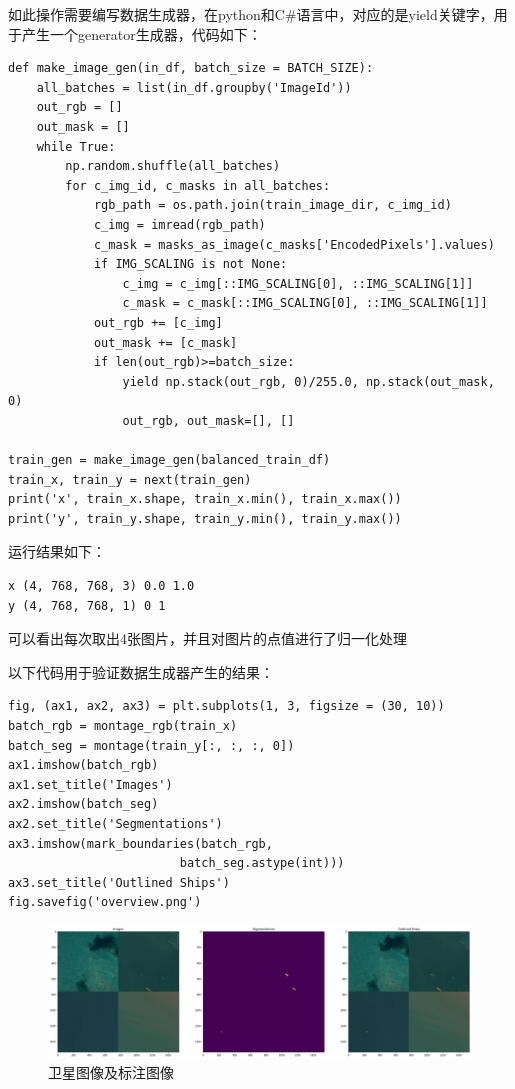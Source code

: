 如此操作需要编写数据生成器，在python和C\#语言中，对应的是yield关键字，用于产生一个generator生成器，代码如下：

\begin{lstlisting}
def make_image_gen(in_df, batch_size = BATCH_SIZE):
    all_batches = list(in_df.groupby('ImageId'))
    out_rgb = []
    out_mask = []
    while True:
        np.random.shuffle(all_batches)
        for c_img_id, c_masks in all_batches:
            rgb_path = os.path.join(train_image_dir, c_img_id)
            c_img = imread(rgb_path)
            c_mask = masks_as_image(c_masks['EncodedPixels'].values)
            if IMG_SCALING is not None:
                c_img = c_img[::IMG_SCALING[0], ::IMG_SCALING[1]]
                c_mask = c_mask[::IMG_SCALING[0], ::IMG_SCALING[1]]
            out_rgb += [c_img]
            out_mask += [c_mask]
            if len(out_rgb)>=batch_size:
                yield np.stack(out_rgb, 0)/255.0, np.stack(out_mask, 0)
                out_rgb, out_mask=[], []

train_gen = make_image_gen(balanced_train_df)
train_x, train_y = next(train_gen)
print('x', train_x.shape, train_x.min(), train_x.max())
print('y', train_y.shape, train_y.min(), train_y.max())
\end{lstlisting}

运行结果如下：

\begin{lstlisting}
x (4, 768, 768, 3) 0.0 1.0
y (4, 768, 768, 1) 0 1
\end{lstlisting}

可以看出每次取出4张图片，并且对图片的点值进行了归一化处理

以下代码用于验证数据生成器产生的结果：

\begin{lstlisting}
fig, (ax1, ax2, ax3) = plt.subplots(1, 3, figsize = (30, 10))
batch_rgb = montage_rgb(train_x)
batch_seg = montage(train_y[:, :, :, 0])
ax1.imshow(batch_rgb)
ax1.set_title('Images')
ax2.imshow(batch_seg)
ax2.set_title('Segmentations')
ax3.imshow(mark_boundaries(batch_rgb, 
                        batch_seg.astype(int)))
ax3.set_title('Outlined Ships')
fig.savefig('overview.png')
\end{lstlisting}

\begin{figure}[htbp]
\centering
\includegraphics[width=1\linewidth]{body/preprocessing_pic/6}
\caption{卫星图像及标注图像}
\label{fig::preprocessing6}
\end{figure}

